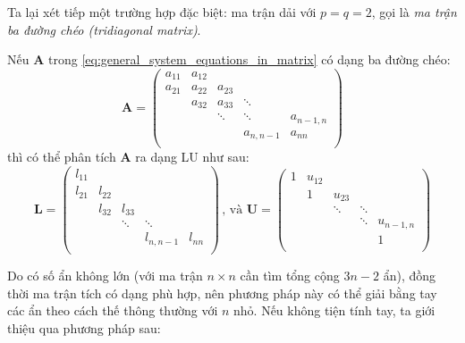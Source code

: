 \documentclass[../../Lectures]{subfiles}
\begin{document}
Ta lại xét tiếp một trường hợp đặc biệt: ma trận dải với \(p = q = 2\), gọi là
\emph{ma trận ba đường chéo (tridiagonal matrix)}.

Nếu \(\bm{A}\) trong \eqref{eq:general_system_equations_in_matrix} có dạng ba
đường chéo:
\[
    \bm{A} =
        \begin{pmatrix}
            a_{11}  &  a_{12}  &          &                &                \\
            a_{21}  &  a_{22}  &  a_{23}  &                &                \\
                    &  a_{32}  &  a_{33}  &     \ddots     &                \\
                    &          &  \ddots  &     \ddots     &  a_{n - 1, n}  \\
                    &          &          &  a_{n, n - 1}  &     a_{nn}     \\
        \end{pmatrix}
\]
thì có thể phân tích \(\bm{A}\) ra dạng LU như sau:
\[
    \bm{L} =
        \begin{pmatrix}
            l_{11}  &          &          &                &          \\
            l_{21}  &  l_{22}  &          &                &          \\
                    &  l_{32}  &  l_{33}  &                &          \\
                    &          &  \ddots  &     \ddots     &          \\
                    &          &          &  l_{n, n - 1}  &  l_{nn}  \\
        \end{pmatrix}
    \, \text{, và }
    \bm{U} =
        \begin{pmatrix}
            1  &  u_{12}  &          &          &                \\
               &    1     &  u_{23}  &          &                \\
               &          &  \ddots  &  \ddots  &                \\
               &          &          &  \ddots  &  u_{n - 1, n}  \\
               &          &          &          &     1          \\

        \end{pmatrix}
\]

Do có số ẩn không lớn (với ma trận \(n \times n\) cần tìm tổng cộng \(3n - 2\)
ẩn), đồng thời ma trận tích có dạng phù hợp, nên phương pháp này có thể giải
bằng tay các ẩn theo cách thế thông thường với \(n\) nhỏ. Nếu không tiện tính
tay, ta giới thiệu qua phương pháp sau:
\end{document}
